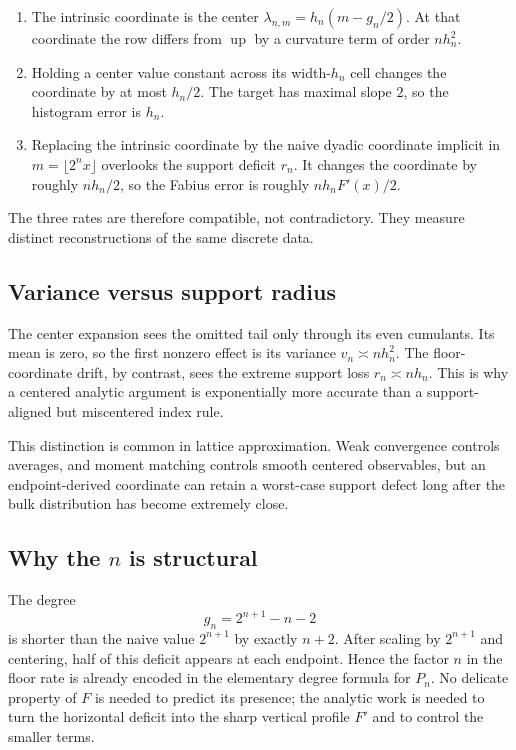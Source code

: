 \documentclass[11pt,oneside]{article}
\theoremstyle{definition}
\theoremstyle{remark}
\newcommand{\Up}{\operatorname{up}}
\begin{document}
\begin{enumerate}
\item The intrinsic coordinate is the center
$\lambda_{n,m}=h_n(m-g_n/2)$.  At that coordinate the row differs from $\Up$ by a curvature
term of order $nh_n^2$.
\item Holding a center value constant across its width-$h_n$ cell changes the coordinate by
at most $h_n/2$.  The target has maximal slope $2$, so the histogram error is $h_n$.
\item Replacing the intrinsic coordinate by the naive dyadic coordinate implicit in
$m=\lfloor2^nx\rfloor$ overlooks the support deficit $r_n$.  It changes the coordinate by
roughly $nh_n/2$, so the Fabius error is roughly $nh_nF'(x)/2$.
\end{enumerate}
The three rates are therefore compatible, not contradictory.  They measure distinct
reconstructions of the same discrete data.

\subsection{Variance versus support radius}

The center expansion sees the omitted tail only through its even cumulants.  Its mean is zero,
so the first nonzero effect is its variance $v_n\asymp nh_n^2$.  The floor-coordinate drift,
by contrast, sees the extreme support loss $r_n\asymp nh_n$.  This is why a centered analytic
argument is exponentially more accurate than a support-aligned but miscentered index rule.

This distinction is common in lattice approximation.  Weak convergence controls averages,
and moment matching controls smooth centered observables, but an endpoint-derived coordinate
can retain a worst-case support defect long after the bulk distribution has become extremely
close.

\subsection{Why the \texorpdfstring{$n$}{n} is structural}

The degree
\begin{equation}
 g_n=2^{n+1}-n-2
\end{equation}
is shorter than the naive value $2^{n+1}$ by exactly $n+2$.  After scaling by
$2^{n+1}$ and centering, half of this deficit appears at each endpoint.  Hence the factor $n$
in the floor rate is already encoded in the elementary degree formula for $P_n$.  No delicate
property of $F$ is needed to predict its presence; the analytic work is needed to turn the
horizontal deficit into the sharp vertical profile $F'$ and to control the smaller terms.
\end{document}
